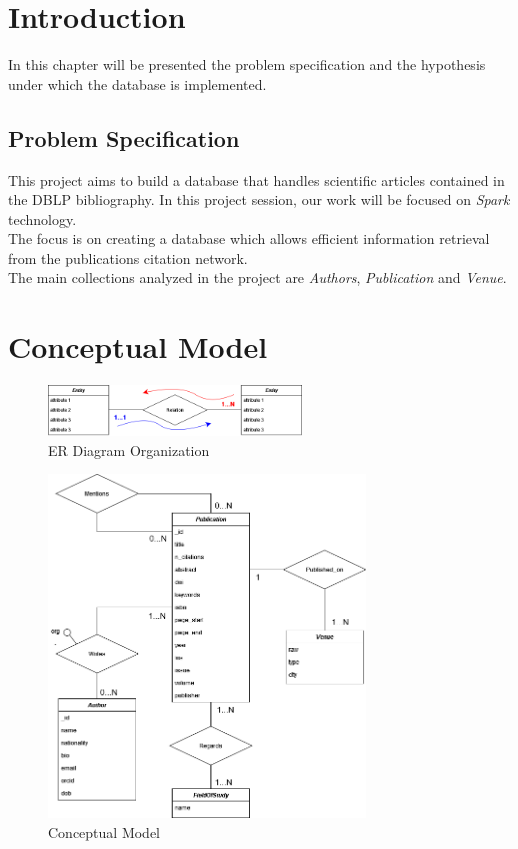 \documentclass{Configuration_Files/PoliMi3i_thesis}
\begin{document}
\mainmatter %

\chapter{Introduction}
\label{ch:introduction}
In this chapter will be presented the problem specification and the hypothesis under which the database is implemented.

\section{Problem Specification}
This project aims to build a database that handles scientific articles contained in the DBLP bibliography. In this project session,
our work will be focused on \emph{Spark} technology. \\
The focus is on creating a database which allows efficient information retrieval from the publications citation network.\\
The main collections analyzed in the project are \emph{Authors}, \emph{Publication} and \emph{Venue}.


\chapter{Conceptual Model}
\label{ch:conc_model}
\begin{figure}[H]
\centering
\includegraphics[width=0.6\textwidth]{legendaER.png}
\caption{ER Diagram Organization}
\label{fig:erleg}
\end{figure}
\begin{figure}[H]
\centering
\includegraphics[width=0.75\textwidth]{ERSpark.png}
\caption{Conceptual Model}
\label{fig:er}
\end{figure}
\newpage
\end{document}
